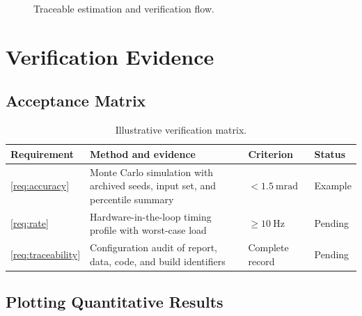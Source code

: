 \documentclass{linearspace-report}
\begin{document}
\begin{figure}[htbp]
  \centering
  \caption{Traceable estimation and verification flow.}
  \label{fig:flow}
\end{figure}

\chapter{Verification Evidence}

\section{Acceptance Matrix}

\begin{table}[htbp]
  \centering
  \caption{Illustrative verification matrix.}
  \label{tab:verification}
  \begin{tabularx}{\linewidth}{@{}p{0.95in}Y p{1.00in}p{0.75in}@{}}
    \toprule
    \textbf{Requirement} & \textbf{Method and evidence} & \textbf{Criterion} & \textbf{Status} \\
    \midrule
    \cref{req:accuracy} & Monte Carlo simulation with archived seeds, input set,
      and percentile summary & \(<\qty{1.5}{\milli\radian}\) & Example \\
    \cref{req:rate} & Hardware-in-the-loop timing profile with worst-case load &
      \(\geq\qty{10}{\hertz}\) & Pending \\
    \cref{req:traceability} & Configuration audit of report, data, code, and build
      identifiers & Complete record & Pending \\
    \bottomrule
  \end{tabularx}
\end{table}

\section{Plotting Quantitative Results}
\end{document}
